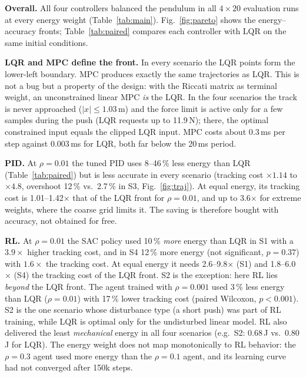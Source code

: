 \documentclass[10pt,twocolumn,a4paper]{article}
\begin{document}
\textbf{Overall.} All four controllers balanced the pendulum in all
$4\times20$ evaluation runs at every energy weight (Table~\ref{tab:main}).
Fig.~\ref{fig:pareto} shows the energy--accuracy fronts; Table~\ref{tab:paired}
compares each controller with LQR on the same initial conditions.

\textbf{LQR and MPC define the front.} In every scenario the LQR points form
the lower-left boundary. MPC produces exactly the same trajectories as LQR.
This is not a bug but a property of the design: with the Riccati matrix as
terminal weight, an unconstrained linear MPC \emph{is} the LQR. In the four
scenarios the track is never approached ($|x|\le1.03$\,m) and the force limit
is active only for a few samples during the push (LQR requests up to
11.9\,N); there, the optimal constrained input equals the clipped LQR input.
MPC costs about 0.3\,ms per step against 0.003\,ms for LQR, both far below
the 20\,ms period.

\textbf{PID.} At $\rho=0.01$ the tuned PID uses 8--46\,\% less energy than
LQR (Table~\ref{tab:paired}) but is less accurate in every scenario (tracking
cost $\times1.14$ to $\times4.8$, overshoot 12\,\% vs.\ 2.7\,\% in S3,
Fig.~\ref{fig:traj}). At
equal energy, its tracking cost is 1.01--1.42$\times$ that of the LQR front for
$\rho=0.01$, and up to 3.6$\times$ for extreme weights, where the coarse grid
limits it. The saving is therefore bought with accuracy, not obtained for
free.

\textbf{RL.} At $\rho=0.01$ the SAC policy used 10\,\% \emph{more} energy
than LQR in S1 with a $3.9\times$ higher tracking cost, and in S4 12\,\% more
energy (not significant, $p=0.37$) with $1.6\times$ the tracking cost. At
equal energy it needs 2.6--9.8$\times$ (S1) and 1.8--6.0$\times$ (S4) the
tracking cost of the LQR front. S2 is the exception: here RL lies \emph{beyond}
the LQR front. The agent trained with $\rho=0.001$ used 3\,\% less energy
than LQR ($\rho=0.01$) with 17\,\% lower tracking cost (paired Wilcoxon,
$p<0.001$). S2 is the one scenario whose disturbance type (a short push) was
part of RL training, while LQR is optimal only for the undisturbed linear
model. RL also delivered the least \emph{mechanical} energy in all four
scenarios (e.g.\ S2: 0.68\,J vs.\ 0.80\,J for LQR). The energy weight does
not map monotonically to RL behavior: the $\rho=0.3$ agent used more energy
than the $\rho=0.1$ agent, and its learning curve had not converged after
150k steps.

\begin{table}[t]
\centering\small
\caption{Paired comparison with LQR at $\rho=0.01$: median ratio over the 20
initial conditions and Wilcoxon $p$-value for the energy difference.}
\label{tab:paired}

\end{table}
\end{document}
